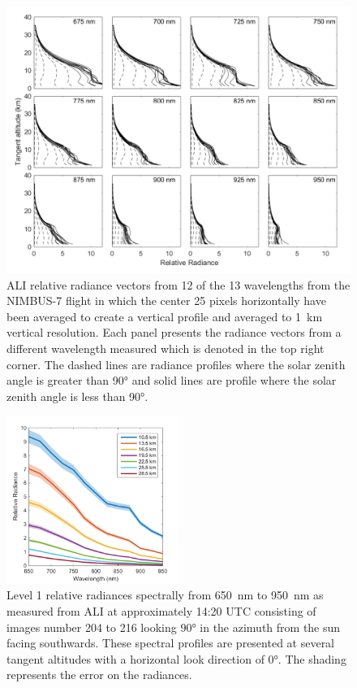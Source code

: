 \documentclass[12pt]{article}
\begin{document}
\begin{figure}
\includegraphics[width=1.0\textwidth]{./Images/5-2-AliRadianceVectors.pdf}
    \caption{ALI relative radiance vectors from 12 of the 13 wavelengths from the NIMBUS-7 flight in which the center 25 pixels horizontally have been averaged to create a vertical profile and averaged to 1~km vertical resolution. Each panel presents the radiance vectors from a different wavelength measured which is denoted in the top right corner. The dashed lines are radiance profiles where the solar zenith angle is greater than 90\si{\degree} and solid lines are profile where the solar zenith angle is less than 90\si{\degree}.}
    \label{fig:AliRadiancesVectors}
\end{figure}

\clearpage

\begin{figure}
\includegraphics[width=0.5\textwidth]{./Images/5-2-AliSpectralRadiances.pdf}
    \caption{Level 1 relative radiances spectrally from 650~nm to 950~nm as measured from ALI at approximately 14:20 UTC consisting of images number 204 to 216 looking 90\si{\degree} in the azimuth from the sun facing southwards. These spectral profiles are presented at several tangent altitudes with a horizontal look direction of 0\si{\degree}. The shading represents the error on the radiances. }
    \label{fig:AliSpectralRadiances}
\end{figure}
\end{document}
